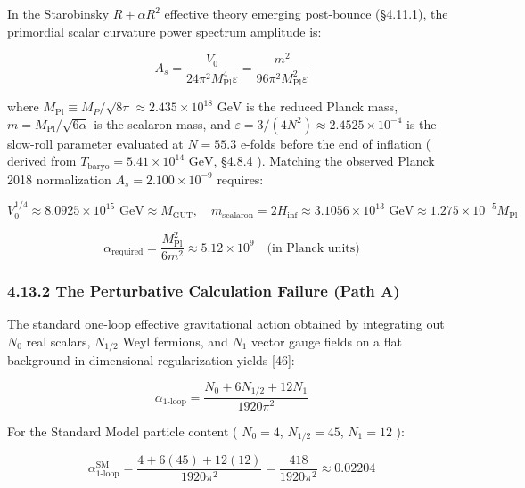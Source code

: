 \documentclass[11pt,a4paper]{article}
\theoremstyle{definition}\newtheorem{definition}{Definition}
\theoremstyle{remark}\newtheorem{remark}{Remark}
\begin{document}
In the Starobinsky $R + \alpha R^2$ effective theory emerging post-bounce (§4.11.1), the primordial scalar curvature power spectrum amplitude is:


\begin{equation}
A_s = \frac{V_0}{24\pi^2 M_{\text{Pl}}^4 \varepsilon} = \frac{m^2}{96\pi^2 M_{\text{Pl}}^2 \varepsilon}
\end{equation}


where $M_{\text{Pl}} \equiv M_P / \sqrt{8\pi} \approx 2.435 \times 10^{18}\text{ GeV}$ is the reduced Planck mass, $m = M_{\text{Pl}} / \sqrt{6\alpha}$ is the scalaron mass, and $\varepsilon = 3/(4N^2) \approx 2.4525 \times 10^{-4}$ is the slow-roll parameter evaluated at $N = 55.3$ e-folds before the end of inflation ( derived from $T_{\text{baryo}} = 5.41 \times 10^{14}\text{ GeV}$, §4.8.4 ). Matching the observed Planck 2018 normalization $A_s = 2.100 \times 10^{-9}$ requires:


\begin{equation}
\boxed{V_0^{1/4} \approx 8.0925 \times 10^{15} \text{ GeV} \approx M_{\text{GUT}}, \quad m_{\text{scalaron}} = 2 H_{\text{inf}} \approx 3.1056 \times 10^{13} \text{ GeV} \approx 1.275 \times 10^{-5} M_{\text{Pl}}}
\end{equation}



\begin{equation}
\alpha_{\text{required}} = \frac{M_{\text{Pl}}^2}{6 m^2} \approx 5.12 \times 10^9 \quad \text{(in Planck units)}
\end{equation}

\subsubsection{4.13.2 The Perturbative Calculation Failure (Path A)}

The standard one-loop effective gravitational action obtained by integrating out $N_0$ real scalars, $N_{1/2}$ Weyl fermions, and $N_1$ vector gauge fields on a flat background in dimensional regularization yields [46]:


\begin{equation}
\alpha_{\text{1-loop}} = \frac{N_0 + 6N_{1/2} + 12N_1}{1920\pi^2}
\end{equation}


For the Standard Model particle content ( $N_0 = 4$, $N_{1/2} = 45$, $N_1 = 12$ ):


\begin{equation}
\alpha_{\text{1-loop}}^{\text{SM}} = \frac{4 + 6(45) + 12(12)}{1920\pi^2} = \frac{418}{1920\pi^2} \approx 0.02204
\end{equation}
\end{document}
